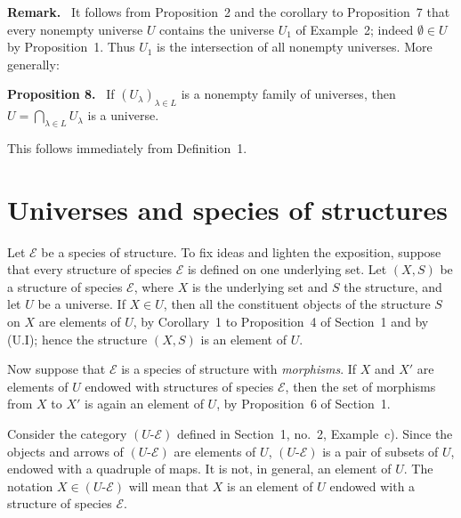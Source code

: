 \documentclass[11pt]{article}
\newenvironment{statement}[1]{\par\medskip\noindent\textbf{#1.}\ }{\par\medskip}
\newenvironment{remarktext}[1]{\par\medskip\noindent\textbf{#1.}\ }{\par\medskip}
\begin{document}
\begin{remarktext}{Remark}
It follows from Proposition~2 and the corollary to Proposition~7 that every nonempty universe \(U\) contains the universe \(U_1\) of Example~2; indeed \(\emptyset\in U\) by Proposition~1. Thus \(U_1\) is the intersection of all nonempty universes. More generally:
\end{remarktext}

\begin{statement}{Proposition 8}
If \((U_\lambda)_{\lambda\in L}\) is a nonempty family of universes, then \(U=\bigcap_{\lambda\in L}U_\lambda\) is a universe.
\end{statement}
This follows immediately from Definition~1.

\section{Universes and species of structures}

Let \(\mathcal E\) be a species of structure. To fix ideas and lighten the exposition, suppose that every structure of species \(\mathcal E\) is defined on one underlying set. Let \((X,S)\) be a structure of species \(\mathcal E\), where \(X\) is the underlying set and \(S\) the structure, and let \(U\) be a universe. If \(X\in U\), then all the constituent objects of the structure \(S\) on \(X\) are elements of \(U\), by Corollary~1 to Proposition~4 of Section~1 and by (U.I); hence the structure \((X,S)\) is an element of \(U\).

Now suppose that \(\mathcal E\) is a species of structure with \emph{morphisms}. If \(X\) and \(X'\) are elements of \(U\) endowed with structures of species \(\mathcal E\), then the set of morphisms from \(X\) to \(X'\) is again an element of \(U\), by Proposition~6 of Section~1.

Consider the category \((U\text{-}\mathcal E)\) defined in Section~1, no.~2, Example~c). Since the objects and arrows of \((U\text{-}\mathcal E)\) are elements of \(U\), \((U\text{-}\mathcal E)\) is a pair of subsets of \(U\), endowed with a quadruple of maps. It is not, in general, an element of \(U\). The notation \(X\in(U\text{-}\mathcal E)\) will mean that \(X\) is an element of \(U\) endowed with a structure of species \(\mathcal E\).
\end{document}
